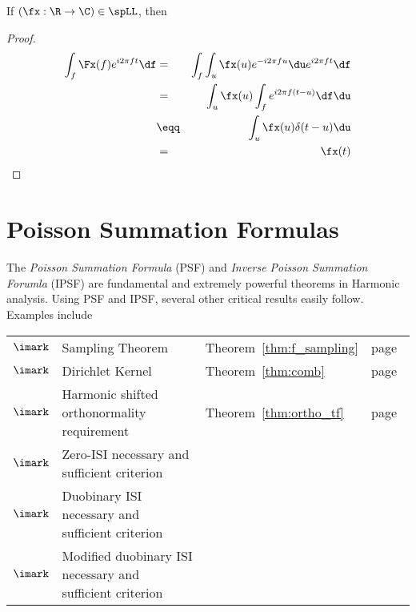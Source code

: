 \begin{theorem}
\label{thm:ha_sr_ft}
If $(\fx:\R\to\C)\in\spLL$, then
\end{theorem}

\begin{proof}
\begin{eqnarray*}
   \int_f \Fx(f) e^{i2\pi ft} \df
     &=&    \int_f \int_u \fx(u) e^{-i2\pi fu}\du e^{i2\pi ft} \df
   \\&=&    \int_u \fx(u) \int_f e^{i2\pi f(t-u)} \df\du 
   \\&\eqq& \int_u \fx(u) \delta(t-u) \du 
   \\&=&    \fx(t)
\end{eqnarray*}
\end{proof}




\section{Poisson Summation Formulas}
\label{sec:psf}
The {\em Poisson Summation Formula} (PSF) and 
{\em Inverse Poisson Summation Forumla} (IPSF)
are fundamental and extremely powerful theorems in Harmonic analysis.
Using PSF and IPSF, several other critical results easily follow.
Examples include\\
\begin{tabular}{llll}
   $\imark$ & Sampling Theorem 
             & Theorem~\ref{thm:f_sampling} 
             & page~\pageref{thm:f_sampling}
\\
   $\imark$ & Dirichlet Kernel 
             & Theorem~\ref{thm:comb}
             & page~\pageref{thm:comb}
\\
   $\imark$ & Harmonic shifted orthonormality requirement
             & Theorem~\ref{thm:ortho_tf}
             & page~\pageref{thm:ortho_tf}
\\
   $\imark$ & Zero-ISI necessary and sufficient criterion
\\
   $\imark$ & Duobinary ISI necessary and sufficient criterion
\\
   $\imark$ & Modified duobinary ISI necessary and sufficient criterion
\end{tabular}
%




